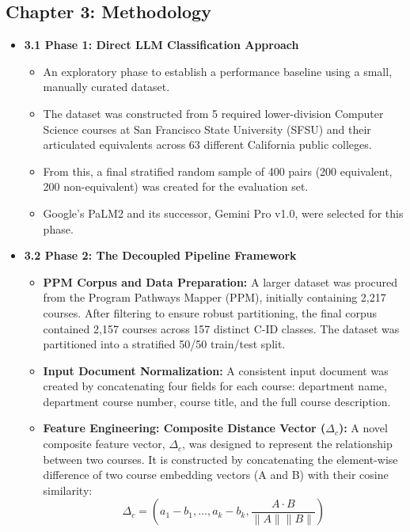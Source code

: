\documentclass[11pt]{article}
\begin{document}
\subsection*{Chapter 3: Methodology}
\begin{itemize}
    \item \textbf{3.1 Phase 1: Direct LLM Classification Approach}
    \begin{itemize}
        \item An exploratory phase to establish a performance baseline using a small, manually curated dataset.
        \item The dataset was constructed from 5 required lower-division Computer Science courses at San Francisco State University (SFSU) and their articulated equivalents across 63 different California public colleges.
        \item From this, a final stratified random sample of 400 pairs (200 equivalent, 200 non-equivalent) was created for the evaluation set.
        \item Google's PaLM2 and its successor, Gemini Pro v1.0, were selected for this phase.
    \end{itemize}
    \item \textbf{3.2 Phase 2: The Decoupled Pipeline Framework}
    \begin{itemize}
        \item \textbf{PPM Corpus and Data Preparation:} A larger dataset was procured from the Program Pathways Mapper (PPM), initially containing 2,217 courses. After filtering to ensure robust partitioning, the final corpus contained 2,157 courses across 157 distinct C-ID classes. The dataset was partitioned into a stratified 50/50 train/test split.
        \item \textbf{Input Document Normalization:} A consistent input document was created by concatenating four fields for each course: department name, department course number, course title, and the full course description.
        \item \textbf{Feature Engineering: Composite Distance Vector ($\Delta_{c}$):} A novel composite feature vector, $\Delta_{c}$, was designed to represent the relationship between two courses. It is constructed by concatenating the element-wise difference of two course embedding vectors (A and B) with their cosine similarity:
        \begin{equation*}
            \Delta_{c}=(a_{1}-b_{1},...,a_{k}-b_{k},\frac{A\cdot B}{\|A\|\|B\|})
        \end{equation*}

\end{itemize}
\end{itemize}
\end{document}
